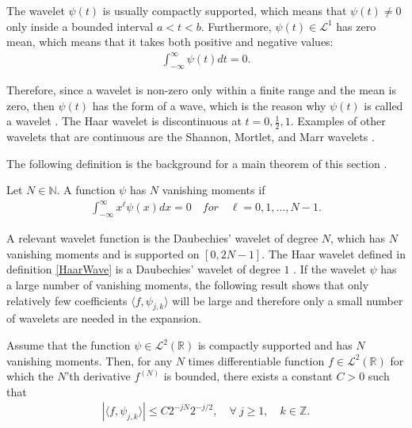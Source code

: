 The wavelet $\psi(t)$ is usually compactly supported, which means that $\psi(t) \neq 0$ only inside a bounded interval $a < t < b$. Furthermore, $\psi(t) \in \mathcal{L}^1$ has zero mean, which means that it takes both positive and negative values:
\begin{align*}
\int_{-\infty}^\infty \psi(t) dt = 0.
\end{align*}

Therefore, since a wavelet is non-zero only within a finite range and the mean is zero, then $\psi(t)$ has the form of a wave, which is the reason why $\psi(t)$ is called a wavelet \cite{page 411, Wang}. The Haar wavelet is discontinuous at $t = 0, \frac{1}{2}, 1$. Examples of other wavelets that are continuous are the Shannon, Mortlet, and Marr wavelets \cite{page 417-420, Wang}.

\newpage
The following definition is the background for a main theorem of this section \cite{page 170, FSE2010}.

\begin{definition}
Let $N \in \mathbb{N}$. A function $\psi$ has $N$ vanishing moments if
\begin{align*}
\int_{-\infty}^\infty x^\ell \psi(x) dx = 0 \quad for \quad \ell = 0, 1, \dots, N-1.
\end{align*}
\end{definition}

A relevant wavelet function is the Daubechies' wavelet of degree $N$, which has $N$ vanishing moments and is supported on $[0,2N-1]$. The Haar wavelet defined in definition \ref{HaarWave} is a Daubechies' wavelet of degree $1$ \cite{page 174, FSE2010}. If the wavelet $\psi$ has a large number of vanishing moments, the following result shows that only relatively few coefficients $\langle f, \psi_{j,k} \rangle$ will be large and therefore only a small number of wavelets are needed in the expansion.

\begin{theorem}
Assume that the function $\psi \in \mathcal{L}^2(\mathbb{R})$ is compactly supported and has $N$ vanishing moments. Then, for any $N$ times differentiable function $f \in \mathcal{L}^2(\mathbb{R})$ for which the $N$'th derivative $f^{(N)}$ is bounded, there exists a constant $C > 0$ such that
\begin{align} \label{eq:decay_wave_coeff}
|\langle f, \psi_{j,k} \rangle| \leq C 2^{-jN} 2^{-j/2}, \quad \forall \ j \geq 1, \quad k \in \mathbb{Z}.
\end{align}
\end{theorem}

